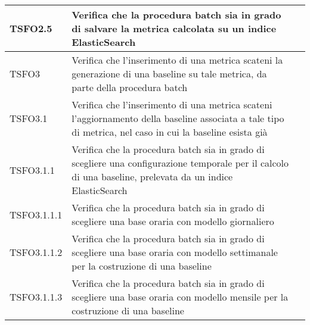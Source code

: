 \begin{center}
\begin{longtable}{ | >{\centering\arraybackslash}m{2.5cm} | >{\raggedright\arraybackslash}m{9cm} | >{\centering\arraybackslash}m{3.5cm} | }
				TSFO2.5 & Verifica che la procedura batch sia in grado di salvare la metrica 
							calcolata su un indice ElasticSearch
						& \donetext{} \\ \hline
				TSFO3 & Verifica che l'inserimento di una metrica scateni la generazione di una baseline su tale metrica,
							da parte della procedura batch
						& \donetext{} \\ \hline
				TSFO3.1 & Verifica che l'inserimento di una metrica scateni l'aggiornamento della baseline associata a tale tipo
							di metrica, nel caso in cui la baseline esista già
						& \donetext{} \\ \hline
				TSFO3.1.1 & Verifica che la procedura batch sia in grado di scegliere una conﬁgurazione temporale per il calcolo di una baseline, prelevata da un indice ElasticSearch
 & \donetext{} \\ \hline
				TSFO3.1.1.1 & Verifica che la procedura batch sia in grado di scegliere una base oraria con modello giornaliero  & \donetext{} \\ \hline
				TSFO3.1.1.2 & Verifica che la procedura batch sia in grado di scegliere una  base oraria con modello settimanale per la costruzione di una baseline
& \donetext{} \\ \hline
				TSFO3.1.1.3 & Verifica che la procedura batch sia in grado di scegliere una base oraria con modello mensile per la costruzione di una baseline
 & \donetext{} \\ \hline
				

\end{longtable}
\end{center}
